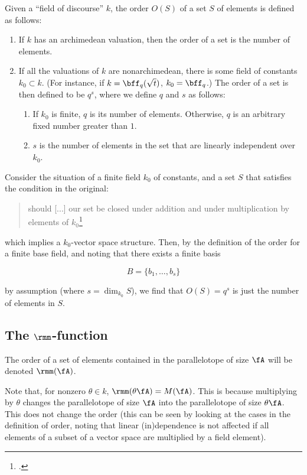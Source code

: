 \begin{defn}
  Given a ``field of discourse'' $k$, the order $O(S)$ of a set $S$ of elements
  is defined as follows:
  \begin{enumerate}
  \item If $k$ has an archimedean valuation, then the order of a set is the
    number of elements.
  \item If all the valuations of $k$ are nonarchimedean, there is some field of
    constants $k_0 \subset k$. (For instance, if $k = \bff_q(\sqrt t)$, $k_0 =
    \bff_q$.) The order of a set is then defined to be $q^s$, where we define
    $q$ and $s$ as follows:
    \begin{enumerate}
    \item If $k_0$ is finite, $q$ is its number of elements. Otherwise, $q$ is
      an arbitrary fixed number greater than $1$.
    \item $s$ is the number of elements in the set that are linearly independent
      over $k_0$.
    \end{enumerate}
  \end{enumerate}
\end{defn}

\begin{example}
  Consider the situation of a finite field $k_0$ of constants, and a
  set $S$ that satisfies the condition in the original:
  \begin{quotation}
    should [...] our set be closed under addition and under multiplication by
    elements of $k_0$\footcite[p. 474]{artinwhaples}
  \end{quotation}
  which implies a $k_0$-vector space structure. Then, by
  the definition of the order for a finite base field, and noting that there
  exists a finite basis

  \[ B = \{b_1, \ldots, b_s \}\]

  by assumption (where $s = \dim_{k_0}S$), we find that $O(S) = q^s$ is just
  the number of elements in $S$.

\end{example}
\subsection{The $\rmm$-function}
\label{subsec:mfunction}
The order of a set of elements contained in the parallelotope of size $\fA$ will
be denoted $\rmm(\fA)$.

Note that, for nonzero $\theta\in k$, $\rmm(\theta\fA)=M(\fA)$. This is because
multiplying by $\theta$ changes the parallelotope of size $\fA$ into the
parallelotope of size $\theta\fA$. This does not change the order (this can be
seen by looking at the cases in the definition of order, noting that linear
(in)dependence is not affected if all elements of a subset of a vector space are
multiplied by a field element).

